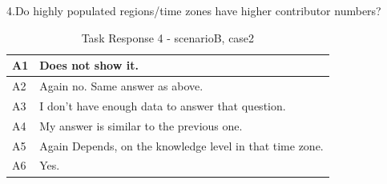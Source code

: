 \documentclass[seploa]{beavtex}
\begin{document}
\begin{appendices}
4.Do highly populated regions/time zones have higher contributor numbers?

\begin{table}[H]
\begin{tabular}{ |p{2cm}|p{12cm}| }
 \hline
 A1 & Does not show it.\\
 \hline
 A2 & Again no. Same answer as above.
\\ \hline
 A3 & I don't have enough data to answer that question.\\ \hline
 A4 & My answer is similar to the previous one.\\ \hline
 A5 & Again Depends, on the knowledge level in that time zone.\\ \hline
 A6 & Yes.\\
 \hline
\end{tabular}
\caption{Task Response 4 - scenarioB, case2}
\label{tab:table34}
\end{table}

\end{appendices}
\end{document}
